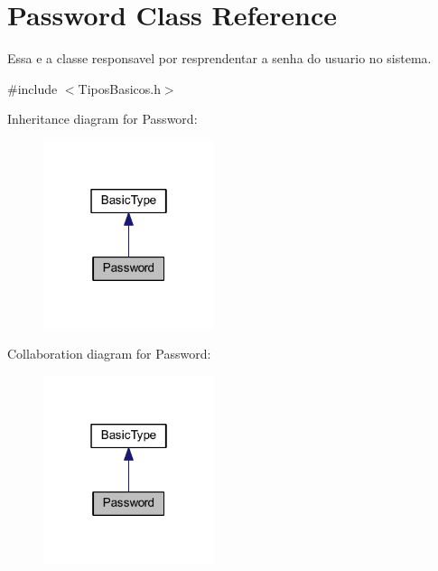 \hypertarget{class_password}{\section{Password Class Reference}
\label{class_password}
}


Essa e a classe responsavel por resprendentar a senha do usuario no sistema.  




{\ttfamily \#include $<$Tipos\-Basicos.\-h$>$}



Inheritance diagram for Password\-:\nopagebreak
\begin{figure}[H]
\begin{center}
\leavevmode
\includegraphics[width=142pt]{class_password__inherit__graph}
\end{center}
\end{figure}


Collaboration diagram for Password\-:\nopagebreak
\begin{figure}[H]
\begin{center}
\leavevmode
\includegraphics[width=142pt]{class_password__coll__graph}
\end{center}
\end{figure}
